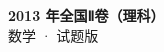 \documentclass[zihao=-4, a4paper]{ctexart}
\begin{document}
\begin{center}
  {\Large\bfseries 2013 年全国Ⅱ卷（理科）}\\[4pt]
  {\large 数学 · 试题版}
\end{center}
\medskip
{}

\end{document}

